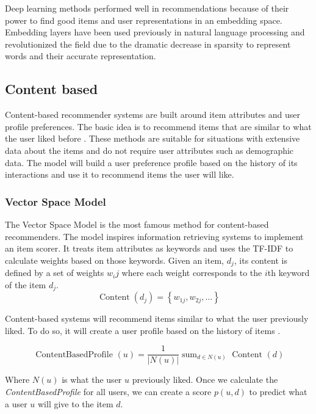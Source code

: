 \documentclass{tex_files/kththesis}
\begin{document}
Deep learning methods performed well in recommendations because of their power to find good items and user representations in an embedding space. Embedding layers have been used previously in natural language processing and revolutionized the field due to the dramatic decrease in sparsity to represent words and their accurate representation.

\subsection{Content based}
Content-based recommender systems are built around item attributes and user profile preferences. The basic idea is to recommend items that are similar to what the user liked before \cite{contentbased}. These methods are suitable for situations with extensive data about the items and do not require user attributes such as demographic data. The model will build a user preference profile based on the history of its interactions and use it to recommend items the user will like.

\subsubsection{Vector Space Model}
The Vector Space Model \cite{vectorspacemodel} is the most famous method for content-based recommenders. The model inspires information retrieving systems to implement an item scorer. It treats item attributes as keywords and uses the TF-IDF \cite{tfidf} to calculate weights based on those keywords. Given an item, $d_j$, its content is defined by a set of weights $w_ij$ where each weight corresponds to the $i$th keyword of the item $d_j$.
\begin{equation}
\operatorname{Content}\left(d_{j}\right)=\left\{w_{1 j}, w_{2 j}, \ldots\right\}
\end{equation}

Content-based systems will recommend items similar to what the user previously liked. To do so, it will create a user profile based on the history of items \cite{contentprofile}.

\begin{equation}
\text { ContentBasedProfile }(u)=\frac{1}{|N(u)|} \operatorname{sum}_{d \in N(u)} \text { Content }(d)
\end{equation}

Where $N(u)$ is what the user $u$ previously liked. Once we calculate the \textit{ContentBasedProfile} for all users, we can create a score $p(u,d)$ to predict what a user $u$ will give to the item $d$.
\end{document}
